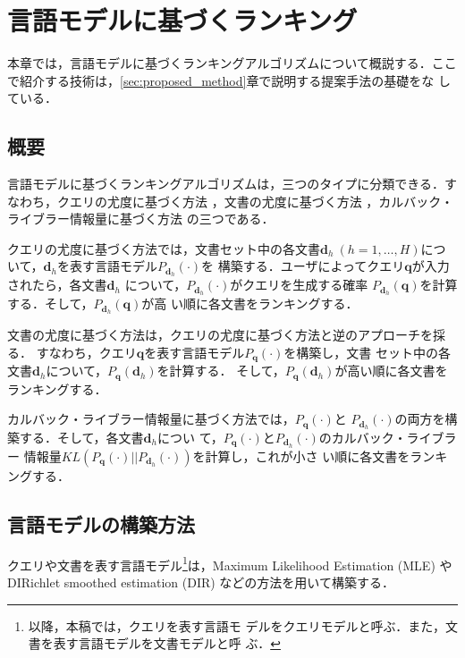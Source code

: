 \documentclass[japanese]{jnlp_1.4}
\begin{document}
\section{言語モデルに基づくランキング} \label{sec:lm_approaches}

本章では，言語モデルに基づくランキングアルゴリズムについて概説する．ここ
で紹介する技術は，\ref{sec:proposed_method}章で説明する提案手法の基礎をな
している．


\subsection{概要}

言語モデルに基づくランキングアルゴリズムは，三つのタイプに分類できる．す
なわち，クエリの尤度に基づく方法 \cite{Ponte1998}，文書の尤度に基づく方法
\cite{Lavrenko2001}，カルバック・ライブラー情報量に基づく方法
\cite{Lafferty2001}の三つである．

クエリの尤度に基づく方法では，文書セット中の各文書$\bm{d}_{h} \ (h = 1,
\dots, H)$について，$\bm{d}_{h}$を表す言語モデル$P_{\bm{d}_{h}}(\cdot)$を
構築する．ユーザによってクエリ$\bm{q}$が入力されたら，各文書$\bm{d}_{h}$
について，$P_{\bm{d}_{h}}(\cdot)$がクエリを生成する確率
$P_{\bm{d}_{h}}(\bm{q})$を計算する．そして，$P_{\bm{d}_{h}}(\bm{q})$が高
い順に各文書をランキングする．

文書の尤度に基づく方法は，クエリの尤度に基づく方法と逆のアプローチを採る．
すなわち，クエリ$\bm{q}$を表す言語モデル$P_{\bm{q}}(\cdot)$を構築し，文書
セット中の各文書$\bm{d}_{h}$について，$P_{\bm{q}}(\bm{d}_{h})$を計算する．
そして，$P_{\bm{q}}(\bm{d}_{h})$が高い順に各文書をランキングする．

カルバック・ライブラー情報量に基づく方法では，$P_{\bm{q}}(\cdot)$と
$P_{\bm{d}_{h}}(\cdot)$の両方を構築する．そして，各文書$\bm{d}_{h}$につい
て，$P_{\bm{q}}(\cdot)$と$P_{\bm{d}_{h}}(\cdot)$のカルバック・ライブラー
情報量$KL(P_{\bm{q}}(\cdot)||P_{\bm{d}_{h}}(\cdot))$を計算し，これが小さ
い順に各文書をランキングする．



\subsection{言語モデルの構築方法} \label{ssec:lm_construction}

クエリや文書を表す言語モデル\footnote{以降，本稿では，クエリを表す言語モ
デルをクエリモデルと呼ぶ．また，文書を表す言語モデルを文書モデルと呼
ぶ．}は，Maximum Likelihood Estimation (MLE) や DIRichlet smoothed
estimation (DIR) \cite{Zhai2004} などの方法を用いて構築する．
\end{document}
